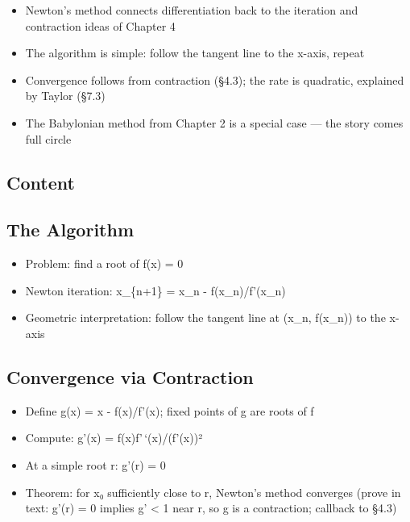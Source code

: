 \documentclass[
  10pt,
  letterpaper,
]{scrbook}
\providecommand{\tightlist}{%
  \setlength{\itemsep}{0pt}\setlength{\parskip}{0pt}}
\begin{document}
\begin{itemize}
\tightlist
\item
  Newton's method connects differentiation back to the iteration and
  contraction ideas of Chapter 4
\item
  The algorithm is simple: follow the tangent line to the x-axis, repeat
\item
  Convergence follows from contraction (§4.3); the rate is quadratic,
  explained by Taylor (§7.3)
\item
  The Babylonian method from Chapter 2 is a special case --- the story
  comes full circle
\end{itemize}

\subsection{Content}\label{content-33}

\subsection{The Algorithm}\label{the-algorithm}

\begin{itemize}
\tightlist
\item
  Problem: find a root of f(x) = 0
\item
  Newton iteration: x\_\{n+1\} = x\_n - f(x\_n)/f'(x\_n)
\item
  Geometric interpretation: follow the tangent line at (x\_n, f(x\_n))
  to the x-axis
\end{itemize}

\subsection{Convergence via
Contraction}\label{convergence-via-contraction}

\begin{itemize}
\tightlist
\item
  Define g(x) = x - f(x)/f'(x); fixed points of g are roots of f
\item
  Compute: g'(x) = f(x)f'\,`(x)/(f'(x))²
\item
  At a simple root r: g'(r) = 0
\item
  Theorem: for x₀ sufficiently close to r, Newton's method converges
  (prove in text: g'(r) = 0 implies \textbar g'\textbar{} \textless{} 1
  near r, so g is a contraction; callback to §4.3)
\end{itemize}
\end{document}
